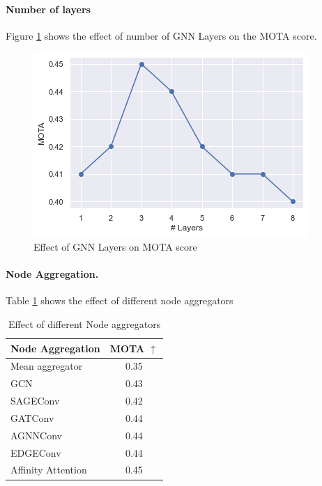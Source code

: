 \documentclass[10pt,twocolumn,letterpaper]{article}
\begin{document}
\paragraph{Number of layers}
Figure \ref{fig:gnn_layers} shows the effect of number of GNN Layers on the MOTA score.
\begin{figure}
	\includegraphics[width=\linewidth]{media/gnn_layers.png}
   \caption{Effect of GNN Layers on MOTA score}
\label{fig:gnn_layers}
\end{figure}

\paragraph{Node Aggregation.}

Table \ref{tab:node_aggregator} shows the effect of different node aggregators

\begin{table}
\begin{center}
\begin{tabular}{|l c|}
\hline
Node Aggregation & MOTA $\uparrow$ \\
\hline\hline
Mean aggregator & 0.35  \\
GCN \cite{kipf2016semi}& 0.43  \\
SAGEConv \cite{hamilton2017inductive} & 0.42  \\
GATConv \cite{velivckovic2017graph}  & 0.44  \\
AGNNConv \cite{thekumparampil2018attention}  & 0.44  \\
EDGEConv  \cite{wang2019dynamic} & 0.44 \\
Affinity Attention & 0.45 \\
\hline
\end{tabular}
\end{center}
\caption{Effect of different Node aggregators}
\label{tab:node_aggregator}
\end{table}
\end{document}
